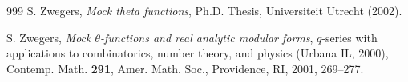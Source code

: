 \documentclass[12pt,reqno]{amsart}
\renewcommand{\(}{\left\(}
\renewcommand{\)}{\right\)}
\numberwithin{equation}{section}
\theoremstyle{plain}
\theoremstyle{definition}
\numberwithin{equation}{section}
\begin{document}
\begin{thebibliography}{999}
 S. Zwegers, {\it Mock theta functions}, Ph.D. Thesis, Universiteit Utrecht (2002).

 S. Zwegers, {\it Mock $\theta$-functions and real analytic modular forms}, $q$-series with applications to combinatorics, number theory, and physics (Urbana IL, 2000), Contemp. Math. {\bf 291}, Amer. Math. Soc., Providence, RI, 2001, 269--277.


  
\end{thebibliography}
\end{document}
